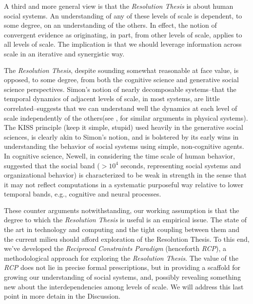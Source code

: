 \documentclass{article}
\begin{document}
A third and more general view is that the \textit{Resolution Thesis} is about human social systems.  An understanding of any of these levels of scale is dependent, to some degree, on an understanding of the others.  In effect, the notion of convergent evidence as originating, in part, from other levels of scale, applies to all levels of scale.  The implication is that we should leverage information across scale in an iterative and synergistic way. 

The \textit{Resolution Thesis}, despite sounding somewhat reasonable at face value, is opposed, to some degree, from both the cognitive science and generative social science perspectives.  Simon's notion of nearly decomposable systems--that the temporal dynamics of adjacent levels of scale, in most systems, are little correlated--suggests that we can understand well the dynamics at each level of scale independently of the others\cite{simon1962}(see \cite{anderson1972}, for similar arguments in physical systems).  The KISS principle (keep it simple, stupid) used heavily in the generative social sciences, is clearly akin to Simon's notion, and is bolstered by its early wins in understanding the behavior of social systems using simple, non-cognitive agents\cite{schelling1969,axelrod1995,epstein2002}.  In cognitive science, Newell, in considering the time scale of human behavior, suggested that the social band ($> 10^4$ seconds, representing social systems and organizational behavior) is characterized to be weak in strength in the sense that it may not reflect computations in a systematic purposeful way relative to lower temporal bands, e.g., cognitive and neural processes\cite{newell1990}.  

These counter arguments notwithstanding, our working assumption is that the degree to which the  \textit{Resolution Thesis} is useful is an empirical issue.  The state of the art in technology and computing and the tight coupling between them and the current milieu should afford exploration of the Resolution Thesis.   To this end, we've developed the \textit{Reciprocal Constraints Paradigm} (henceforth \textit{RCP}), a methodological approach for exploring the  \textit{Resolution Thesis}. The value of the \textit{RCP} does not lie in precise formal prescriptions, but in providing a scaffold for growing our understanding of social systems, and, possibly revealing something new about the interdependencies among levels of scale.  We will address this last point in more detain in the Discussion.
\end{document}
